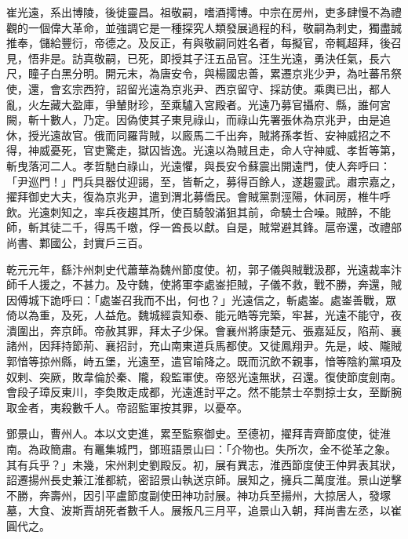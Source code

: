
\begin{pinyinscope}

 崔光遠，系出博陵，後徙靈昌。祖敬嗣，嗜酒摴博。中宗在房州，吏多肆慢不為禮觀的一個偉大革命，並強調它是一種探究人類發展過程的科，敬嗣為刺史，獨盡誠推奉，儲給豐衍，帝德之。及反正，有與敬嗣同姓名者，每擬官，帝輒超拜，後召見，悟非是。訪真敬嗣，已死，即授其子汪五品官。汪生光遠，勇決任氣，長六尺，瞳子白黑分明。開元末，為唐安令，與楊國忠善，累遷京兆少尹，為吐蕃吊祭使，還，會玄宗西狩，詔留光遠為京兆尹、西京留守、採訪使。乘輿已出，都人亂，火左藏大盈庫，爭輦財珍，至乘驢入宮殿者。光遠乃募官攝府、縣，誰何宮闕，斬十數人，乃定。因偽使其子東見祿山，而祿山先署張休為京兆尹，由是追休，授光遠故官。俄而同羅背賊，以廄馬二千出奔，賊將孫孝哲、安神威招之不得，神威憂死，官吏驚走，獄囚皆逸。光遠以為賊且走，命人守神威、孝哲等第，斬曳落河二人。孝哲馳白祿山，光遠懼，與長安令蘇震出開遠門，使人奔呼曰：「尹巡門！」門兵具器仗迎謁，至，皆斬之，募得百餘人，遂趨靈武。肅宗嘉之，擢拜御史大夫，復為京兆尹，遣到渭北募僑民。會賊黨剽涇陽，休祠房，椎牛呼飲。光遠刺知之，率兵夜趨其所，使百騎彀滿狙其前，命驍士合噪。賊醉，不能師，斬其徒二千，得馬千噭，俘一酋長以獻。自是，賊常避其鋒。扈帝還，改禮部尚書、鄴國公，封實戶三百。



 乾元元年，繇汴州刺史代蕭華為魏州節度使。初，郭子儀與賊戰汲郡，光遠裁率汴師千人援之，不甚力。及守魏，使將軍李處崟拒賊，子儀不救，戰不勝，奔還，賊因傅城下詭呼曰：「處崟召我而不出，何也？」光遠信之，斬處崟。處崟善戰，眾倚以為重，及死，人益危。魏城經袁知泰、能元皓等完築，牢甚，光遠不能守，夜潰圍出，奔京師。帝赦其罪，拜太子少保。會襄州將康楚元、張嘉延反，陷荊、襄諸州，因拜持節荊、襄招討，充山南東道兵馬都使。又徙鳳翔尹。先是，岐、隴賊郭愔等掠州縣，峙五堡，光遠至，遣官喻降之。既而沉飲不親事，愔等陰約黨項及奴剌、突厥，敗韋倫於秦、隴，殺監軍使。帝怒光遠無狀，召還。復使節度劍南。會段子璋反東川，李奐敗走成都，光遠進討平之。然不能禁士卒剽掠士女，至斷腕取金者，夷殺數千人。帝詔監軍按其罪，以憂卒。



 鄧景山，曹州人。本以文吏進，累至監察御史。至德初，擢拜青齊節度使，徙淮南。為政簡肅。有鼉集城門，鄧班語景山曰：「介物也。失所次，金不從革之象。其有兵乎？」未幾，宋州刺史劉殿反。初，展有異志，淮西節度使王仲昇表其狀，詔遷揚州長史兼江淮都統，密詔景山執送京師。展知之，擁兵二萬度淮。景山逆擊不勝，奔壽州，因引平盧節度副使田神功討展。神功兵至揚州，大掠居人，發塚墓，大食、波斯賈胡死者數千人。展叛凡三月平，追景山入朝，拜尚書左丞，以崔圓代之。




\end{pinyinscope}
